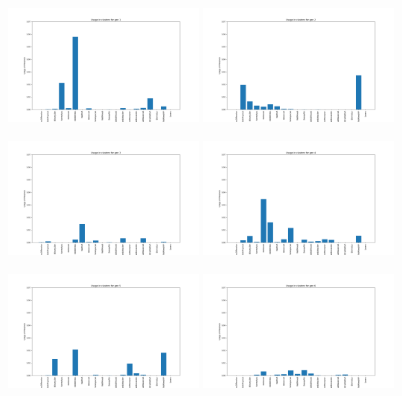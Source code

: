 \documentclass[a4paper,12pt]{article}
\begin{document}
\begin{figure}[!h]
    \centering

    \includegraphics[width=0.45\textwidth]{Clustering/usage_gen/gen1.png}
    \includegraphics[width=0.45\textwidth]{Clustering/usage_gen/gen2.png}
    

    \vspace{1em}  %

    \includegraphics[width=0.45\textwidth]{Clustering/usage_gen/gen3.png}
    \includegraphics[width=0.45\textwidth]{Clustering/usage_gen/gen4.png}
    

    \vspace{1em}  %

    \includegraphics[width=0.45\textwidth]{Clustering/usage_gen/gen5.png}
    \includegraphics[width=0.45\textwidth]{Clustering/usage_gen/gen6.png}
    


\end{figure}
\end{document}
